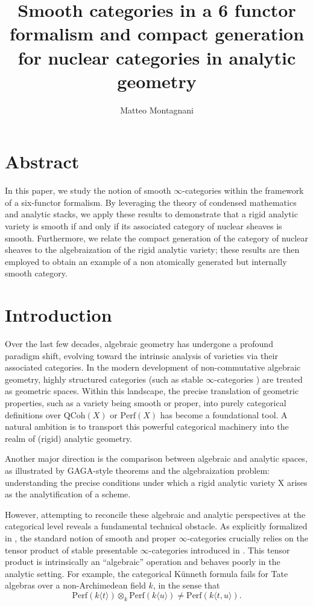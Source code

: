\documentclass[oneside, hidelinks, 12pt, a4paper,reqno]{amsart}
\title{Smooth categories in a 6 functor formalism and compact generation for nuclear categories in analytic geometry}
\author{Matteo Montagnani}
\theoremstyle{plain}
\theoremstyle{definition}
\theoremstyle{plain}
\newcommand{\Perf}{\mathrm{Perf}}
\newcommand{\cates}{$\infty$-categories }
\newcommand{\Qcoh}{\mathrm{QCoh}}
\begin{document}
\maketitle


\section*{Abstract}
In this paper, we study the notion of smooth $\infty$-categories within the framework of a six-functor formalism. By leveraging the theory of condensed mathematics and analytic stacks, we apply these results to demonstrate that a rigid analytic variety is smooth if and only if its associated category of nuclear sheaves is smooth. Furthermore, we relate the compact generation of the category of nuclear sheaves to the algebraization of the rigid analytic variety; these results are then employed to obtain an example of a non atomically generated but internally smooth category.

\tableofcontents 


\section{Introduction}
Over the last few decades, algebraic geometry has undergone a profound paradigm shift, evolving toward the intrinsic analysis of varieties via their associated categories. In the modern development of non-commutative algebraic geometry, highly structured categories (such as stable \cates) are treated as geometric spaces. Within this landscape, the precise translation of geometric properties, such as a variety being smooth or proper, into purely categorical definitions over $\Qcoh(X)$ or $\Perf(X)$ has become a foundational tool. A natural ambition is to transport this powerful categorical machinery into the realm of (rigid) analytic geometry.

Another major direction is the comparison between algebraic and analytic spaces, as illustrated by GAGA-style theorems and the algebraization problem: understanding the precise conditions under which a rigid analytic variety X arises as the analytification of a scheme.

However, attempting to reconcile these algebraic and analytic perspectives at the categorical level reveals a fundamental technical obstacle. As explicitly formalized in , the standard notion of smooth and proper \cates crucially relies on the tensor product of stable presentable \cates introduced in \cite{HA}. This tensor product is intrinsically an ``algebraic'' operation and behaves poorly in the analytic setting. For example, the categorical K\"unneth formula fails for Tate algebras over a non-Archimedean field $k$, in the sense that
\begin{equation}\label{eq: kunnet intro}
\Perf(k\langle t \rangle) \otimes_k \Perf(k \langle u \rangle) \neq \Perf(k\langle t,u \rangle).     
\end{equation}
\end{document}
